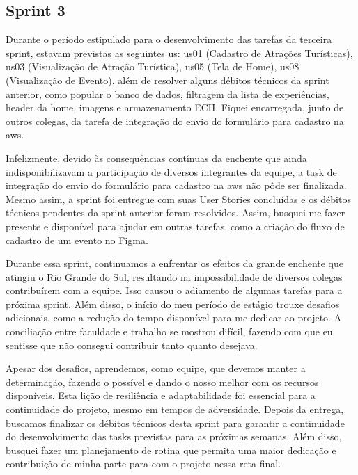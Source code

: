 \subsection{Sprint 3}
Durante o período estipulado para o desenvolvimento das tarefas da terceira sprint, estavam previstas as seguintes \ac{us}: \ac{us}01 (Cadastro de Atrações Turísticas), \ac{us}03 (Visualização de Atração Turística), \ac{us}05 (Tela de Home), \ac{us}08 (Visualização de Evento), além de resolver alguns débitos técnicos da sprint anterior, como popular o banco de dados, filtragem da lista de experiências, header da home, imagens e armazenamento ECII. Fiquei encarregada, junto de outros colegas, da tarefa de integração do envio do formulário para cadastro na \ac{aws}.

Infelizmente, devido às consequências contínuas da enchente que ainda indisponibilizavam a participação de diversos integrantes da equipe, a task de integração do envio do formulário para cadastro na \ac{aws} não pôde ser finalizada. Mesmo assim, a sprint foi entregue com suas User Stories concluídas e os débitos técnicos pendentes da sprint anterior foram resolvidos. Assim, busquei me fazer presente e disponível para ajudar em outras tarefas, como a criação do fluxo de cadastro de um evento no Figma.

Durante essa sprint, continuamos a enfrentar os efeitos da grande enchente que atingiu o Rio Grande do Sul, resultando na impossibilidade de diversos colegas contribuírem com a equipe. Isso causou o adiamento de algumas tarefas para a próxima sprint. Além disso, o início do meu período de estágio trouxe desafios adicionais, como a redução do tempo disponível para me dedicar ao projeto. A conciliação entre faculdade e trabalho se mostrou difícil, fazendo com que eu sentisse que não consegui contribuir tanto quanto desejava.

Apesar dos desafios, aprendemos, como equipe, que devemos manter a determinação, fazendo o possível e dando o nosso melhor com os recursos disponíveis. Esta lição de resiliência e adaptabilidade foi essencial para a continuidade do projeto, mesmo em tempos de adversidade.
Depois da entrega, buscamos finalizar os débitos técnicos desta sprint para garantir a continuidade do desenvolvimento das tasks previstas para as próximas semanas. Além disso, busquei fazer um planejamento de rotina que permita uma maior dedicação e contribuição de minha parte para com o projeto nessa reta final.